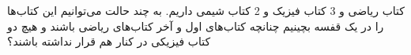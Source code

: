  کتاب ریاضی و 3 کتاب فیزیک و 2 کتاب شیمی داریم. به چند حالت می‌توانیم این کتاب‌ها را در یک قفسه بچینیم چنانچه
 کتاب‌های اول و آخر کتاب‌های ریاضی باشند و هیچ دو کتاب فیزیکی در کنار هم قرار نداشته باشند؟
